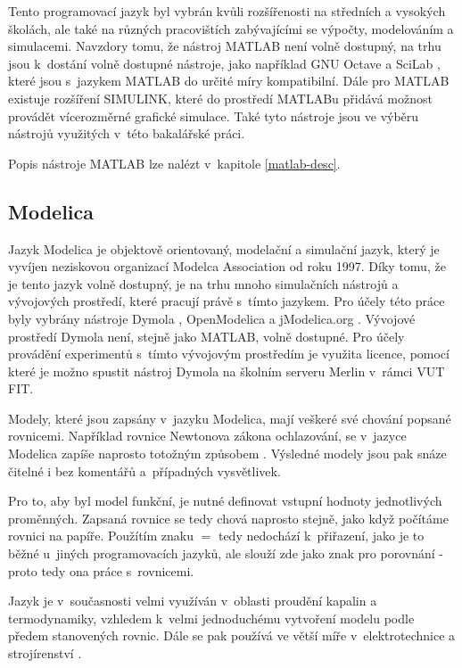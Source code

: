 Tento programovací jazyk byl vybrán kvůli rozšířenosti na středních a vysokých školách, ale také na různých pracovištích zabývajícími se výpočty, modelováním a simulacemi. Navzdory tomu, že nástroj MATLAB není volně dostupný, na trhu jsou k~dostání volně dostupné nástroje, jako například GNU Octave \cite{OctaveManual} a SciLab \cite{scilab}, které jsou s~jazykem MATLAB do určité míry kompatibilní. Dále pro MATLAB existuje rozšíření SIMULINK, které do prostředí MATLABu přidává možnost provádět vícerozměrné grafické simulace. Také tyto nástroje jsou ve výběru nástrojů využitých v~této bakalářské práci.

Popis nástroje MATLAB lze nalézt v~kapitole \ref{matlab-desc}.
\subsection*{Modelica}
\label{modelica-lang}
Jazyk Modelica je objektově orientovaný, modelační a simulační jazyk, který je vyvíjen neziskovou organizací Modelca Association od roku 1997. Díky tomu, že je tento jazyk volně dostupný, je na trhu mnoho simulačních nástrojů a vývojových prostředí, které pracují právě s~tímto jazykem. Pro účely této práce byly vybrány nástroje Dymola \cite{Fritzson02modelica--}, OpenModelica \cite{Fritzson02modelica--} a jModelica.org \cite{jmodelica}. Vývojové prostředí Dymola není, stejně jako MATLAB, volně dostupné. Pro účely provádění experimentů s~tímto vývojovým prostředím je využita licence, pomocí které je možno spustit nástroj Dymola na školním serveru Merlin v~rámci VUT FIT.

Modely, které jsou zapsány v~jazyku Modelica, mají veškeré své chování popsané rovnicemi. Například rovnice Newtonova zákona ochlazování, se v~jazyce Modelica zapíše naprosto totožným způsobem \cite{modelica-example}. Výsledné modely jsou pak snáze čitelné i bez komentářů a~případných vysvětlivek.

Pro to, aby byl model funkční, je nutné definovat vstupní hodnoty jednotlivých proměnných. Zapsaná rovnice se tedy chová naprosto stejně, jako když počítáme rovnici na papíře. Použítím znaku $ = $ tedy nedochází k~přiřazení, jako je to běžné u~jiných programovacích jazyků, ale slouží zde jako znak pro porovnání - proto tedy ona práce s~rovnicemi.

Jazyk je v~současnosti velmi využíván v~oblasti proudění kapalin a termodynamiky, vzhledem k~velmi jednoduchému vytvoření modelu podle předem stanovených rovnic. Dále se pak používá ve větší míře v~elektrotechnice a strojírenství \cite{modelica-example}.

